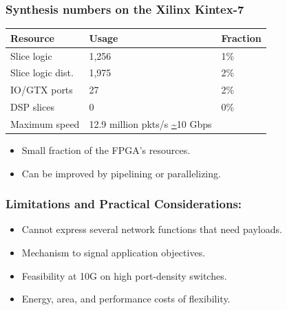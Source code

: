 \begin{Large}
\begin{frame}[plain]
\frametitle{Synthesis numbers on the Xilinx Kintex-7}
\begin{center}
\begin{tabular}{p{} p{} p{}}
\bf Resource & \bf Usage & \bf Fraction \\
\hline Slice logic & 1,256 & 1\% \\
Slice logic dist. & 1,975 & 2\% \\
IO/GTX ports & 27 & 2\% \\
DSP slices & 0 & 0\% \\
Maximum speed & 12.9 million pkts/s \url{~}10 Gbps \\
\end{tabular}
\end{center}
\begin{itemize}
\item Small fraction of the FPGA's resources.
\item Can be improved by pipelining or parallelizing.
\end{itemize}
\end{frame}

\begin{frame}[plain]
\frametitle{Limitations and Practical Considerations:}
\begin{itemize}
\item Cannot express several network functions that need payloads.
\item Mechanism to signal application objectives.
\item Feasibility at 10G on high port-density  switches.
\item Energy, area, and performance costs of flexibility.
\end{itemize}
\end{frame}



\end{Large}
